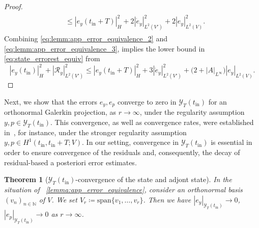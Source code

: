 \documentclass{m2an}
\newcommand{\N}{\mathbb N}
\newcommand{\bu}{\mathbf{u}}
\newcommand{\tint}{t_{\mathrm{in}}}
\newcommand{\mY}{{\mathscr Y}}
\newcommand{\calR}{\mathcal{R}}
\newcommand{\Res}{\calR}%
\newcommand{\norm}[2]{\left|#1\right|_{#2}}
\newtheorem{theorem}[thrm]{Theorem}
\begin{document}
\begin{proof}
\begin{align}
\begin{aligned}
            &\leq \norm{e_y(\tint+T)}{H}^2 + 2\norm{\dot e_y}{L^2(V')}^2+2\norm{ e_y}{L^2(V)}^2.
        \end{aligned}
    \end{align}
    Combining \eqref{eq:lemm:app_error_equivalence_2} and \eqref{eq:lemm:app_error_equivalence_3}, implies the lower bound in \eqref{eq:state_errorest_equiv} from
    \begin{equation*}
         \norm{e_y(\tint)}{H}^2+\norm{\Res_y}{L^2(V')}^2\leq \norm{e_y(\tint+T)}{H}^2 + 3\norm{\dot e_y}{L^2(V')}^2 + \big(2+\norm{A}{L^\infty}\big)\norm{e_y}{L^2(V)}. 
    \end{equation*}
\end{proof}
%
Next, we show that the errors \( e_y, e_p \) converge to zero in \( \mY_T(\tint) \) for an orthonormal Galerkin projection, as \( r \to \infty \), under the regularity assumption \( y, p \in \mY_T(\tint) \). This convergence, as well as convergence rates, were established in~\cite[Theorem~3.11]{GubV17}, for instance, under the stronger regularity assumption \( y, p \in H^1(\tint,\tint+T;V) \). In our setting, convergence in $\mY_T(\tint)$ is essential in order to ensure convergence of the residuals and, consequently, the decay of residual-based a posteriori error estimates.
%
\begin{theorem}[$\mY_T(\tint)$-convergence of the state and adjont state]\label{theo:APP_convergence}
%
In the situation of \ \cref{lemma:app_error_equivalence}, 
consider an orthonormal basis $(v_n)_{n\in \N}$ of $V$. We set $V_r\coloneqq \text{span}\{v_1,\ldots,v_r\}$. Then we have $\norm{ e_y}{\mY_T(\tint)}\to 0$, $\norm{ e_p}{\mY_T(\tint)}\to 0$ as $r\to \infty$. 
%
\end{theorem}
%
\end{document}
